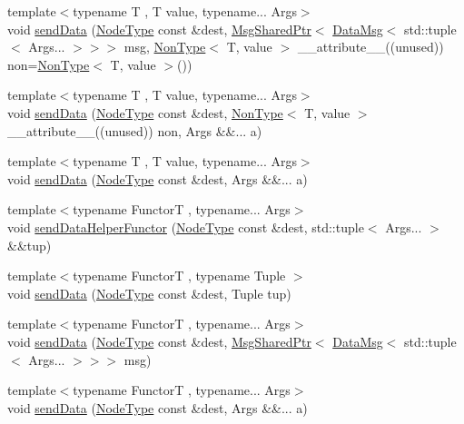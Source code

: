\begin{DoxyCompactItemize}
{\footnotesize template$<$typename T , T value, typename... Args$>$ }\\void \hyperlink{structvt_1_1param_1_1_param_af0791eb37c18d175bdcce5e2f2384427}{send\+Data} (\hyperlink{namespacevt_a866da9d0efc19c0a1ce79e9e492f47e2}{Node\+Type} const \&dest, \hyperlink{namespacevt_ab2b3d506ec8e8d1540aede826d84a239}{Msg\+Shared\+Ptr}$<$ \hyperlink{structvt_1_1param_1_1_data_msg}{Data\+Msg}$<$ std\+::tuple$<$ Args... $>$$>$$>$ msg, \hyperlink{structvt_1_1param_1_1_non_type}{Non\+Type}$<$ T, value $>$ \+\_\+\+\_\+attribute\+\_\+\+\_\+((unused)) non=\hyperlink{structvt_1_1param_1_1_non_type}{Non\+Type}$<$ T, value $>$())
\item 
{\footnotesize template$<$typename T , T value, typename... Args$>$ }\\void \hyperlink{structvt_1_1param_1_1_param_ac71ae9da515916042649b9c6074cbdf3}{send\+Data} (\hyperlink{namespacevt_a866da9d0efc19c0a1ce79e9e492f47e2}{Node\+Type} const \&dest, \hyperlink{structvt_1_1param_1_1_non_type}{Non\+Type}$<$ T, value $>$ \+\_\+\+\_\+attribute\+\_\+\+\_\+((unused)) non, Args \&\&... a)
\item 
{\footnotesize template$<$typename T , T value, typename... Args$>$ }\\void \hyperlink{structvt_1_1param_1_1_param_ae748b6bd022c33e842a83a50865454be}{send\+Data} (\hyperlink{namespacevt_a866da9d0efc19c0a1ce79e9e492f47e2}{Node\+Type} const \&dest, Args \&\&... a)
\item 
{\footnotesize template$<$typename FunctorT , typename... Args$>$ }\\void \hyperlink{structvt_1_1param_1_1_param_a51452ecb0d885e4a3755df33657d613e}{send\+Data\+Helper\+Functor} (\hyperlink{namespacevt_a866da9d0efc19c0a1ce79e9e492f47e2}{Node\+Type} const \&dest, std\+::tuple$<$ Args... $>$ \&\&tup)
\item 
{\footnotesize template$<$typename FunctorT , typename Tuple $>$ }\\void \hyperlink{structvt_1_1param_1_1_param_ad7524b5a6d2609de674fe4040d2fb90d}{send\+Data} (\hyperlink{namespacevt_a866da9d0efc19c0a1ce79e9e492f47e2}{Node\+Type} const \&dest, Tuple tup)
\item 
{\footnotesize template$<$typename FunctorT , typename... Args$>$ }\\void \hyperlink{structvt_1_1param_1_1_param_aa2405fed990331c40b9f8e05e8649a26}{send\+Data} (\hyperlink{namespacevt_a866da9d0efc19c0a1ce79e9e492f47e2}{Node\+Type} const \&dest, \hyperlink{namespacevt_ab2b3d506ec8e8d1540aede826d84a239}{Msg\+Shared\+Ptr}$<$ \hyperlink{structvt_1_1param_1_1_data_msg}{Data\+Msg}$<$ std\+::tuple$<$ Args... $>$$>$$>$ msg)
\item 
{\footnotesize template$<$typename FunctorT , typename... Args$>$ }\\void \hyperlink{structvt_1_1param_1_1_param_a706146de8f6eab423f7e5c7872587519}{send\+Data} (\hyperlink{namespacevt_a866da9d0efc19c0a1ce79e9e492f47e2}{Node\+Type} const \&dest, Args \&\&... a)
\end{DoxyCompactItemize}


